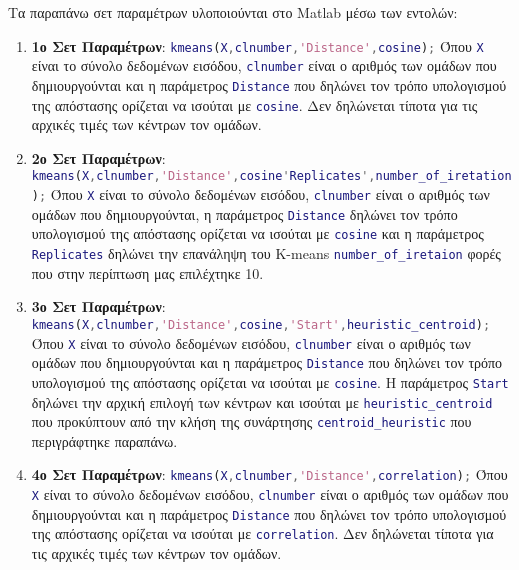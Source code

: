 Τα παραπάνω σετ παραμέτρων υλοποιούνται στο Matlab μέσω των εντολών:
\begin{enumerate}
    \item  \textbf{1ο Σετ Παραμέτρων}: \lstinline[language=MATLAB]!kmeans(X,clnumber,'Distance',cosine);!
    Όπου \lstinline[language=MATLAB]!X! είναι το σύνολο δεδομένων εισόδου, \lstinline[language=MATLAB]!clnumber! είναι ο αριθμός των ομάδων που δημιουργούνται και η παράμετρος \lstinline[language=MATLAB]!Distance! που δηλώνει τον τρόπο υπολογισμού της απόστασης ορίζεται να ισούται με \lstinline[language=MATLAB]!cosine!. Δεν δηλώνεται τίποτα για τις αρχικές τιμές των κέντρων τον ομάδων.
    \item  \textbf{2ο Σετ Παραμέτρων}:
\lstinline[language=MATLAB]!kmeans(X,clnumber,'Distance',cosine'Replicates',number_of_iretation);!
Όπου \lstinline[language=MATLAB]!X! είναι το σύνολο δεδομένων εισόδου, \lstinline[language=MATLAB]!clnumber! είναι ο αριθμός των ομάδων που δημιουργούνται, η παράμετρος \lstinline[language=MATLAB]!Distance! δηλώνει τον τρόπο υπολογισμού της απόστασης ορίζεται να ισούται με \lstinline[language=MATLAB]!cosine! και η παράμετρος \lstinline[language=MATLAB]!Replicates! δηλώνει την επανάληψη του K-means \lstinline[language=MATLAB]!number_of_iretaion! φορές που στην περίπτωση μας επιλέχτηκε 10. 
    \item  \textbf{3ο Σετ Παραμέτρων}:
\lstinline[language=MATLAB]!kmeans(X,clnumber,'Distance',cosine,'Start',heuristic_centroid);!
Όπου \lstinline[language=MATLAB]!X! είναι το σύνολο δεδομένων εισόδου, \lstinline[language=MATLAB]!clnumber! είναι ο αριθμός των ομάδων που δημιουργούνται και η παράμετρος \lstinline[language=MATLAB]!Distance! που δηλώνει τον τρόπο υπολογισμού της απόστασης ορίζεται να ισούται με \lstinline[language=MATLAB]!cosine!. Η παράμετρος \lstinline[language=MATLAB]!Start! δηλώνει την αρχική επιλογή των κέντρων και ισούται με \lstinline[language=MATLAB]!heuristic_centroid! που προκύπτουν από την κλήση της συνάρτησης \lstinline[language=MATLAB]!centroid_heuristic! που περιγράφτηκε παραπάνω.
    \item  \textbf{4ο Σετ Παραμέτρων}:
\lstinline[language=MATLAB]!kmeans(X,clnumber,'Distance',correlation);!
Όπου \lstinline[language=MATLAB]!X! είναι το σύνολο δεδομένων εισόδου, \lstinline[language=MATLAB]!clnumber! είναι ο αριθμός των ομάδων που δημιουργούνται και η παράμετρος \lstinline[language=MATLAB]!Distance! που δηλώνει τον τρόπο υπολογισμού της απόστασης ορίζεται να ισούται με \lstinline[language=MATLAB]!correlation!. Δεν δηλώνεται τίποτα για τις αρχικές τιμές των κέντρων τον ομάδων.

\end{enumerate}
